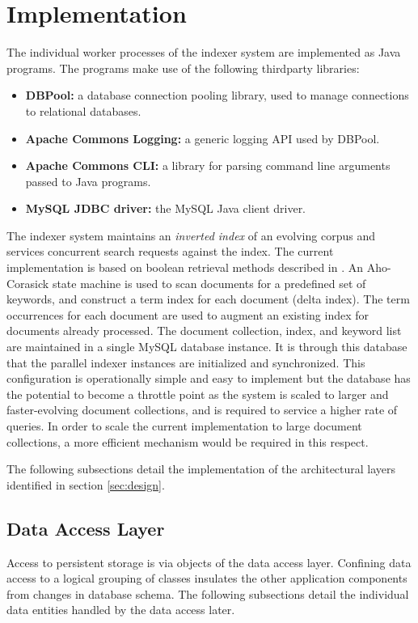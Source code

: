 \documentclass[10pt]{report}
\begin{document}
\section{Implementation}
\label{sec:implementation}
The individual worker processes of the indexer system are implemented as Java
programs. The programs make use of the following thirdparty libraries:

\begin{itemize}
  \item \textbf{DBPool:} a database connection pooling library, used
    to manage connections to relational databases.
  \item \textbf{Apache Commons Logging:} a generic logging API used by
    DBPool.
  \item \textbf{Apache Commons CLI:} a library for parsing command
    line arguments passed to Java programs.
  \item \textbf{MySQL JDBC driver:} the MySQL Java client driver.
\end{itemize}


The indexer system maintains an \textit{inverted index} of an evolving
corpus and services concurrent search requests against the index. The
current implementation is based on boolean retrieval methods described
in \cite{RefWorks:109}. An Aho-Corasick state machine
\cite{RefWorks:103} is used to scan documents for a predefined set of
keywords, and construct a term index for each document (delta
index). The term occurrences for each document are used to augment an
existing index for documents already processed. The document
collection, index, and keyword list are maintained in a single MySQL
database instance. It is through this database that the parallel
indexer instances are initialized and synchronized. This configuration
is operationally simple and easy to implement but the database has the
potential to become a throttle point as the system is scaled to larger
and faster-evolving document collections, and is required to service a
higher rate of queries. In order to scale the current implementation
to large document collections, a more efficient mechanism would be
required in this respect.

The following subsections detail the implementation of the
architectural layers identified in section \ref{sec:design}.

\subsection{Data Access Layer}
\label{sec:dataaccesslayer}
Access to persistent storage is via objects of the data access
layer. Confining data access to a logical grouping of classes
insulates the other application components from changes in database
schema. The following subsections detail the individual data entities
handled by the data access later.
\end{document}

